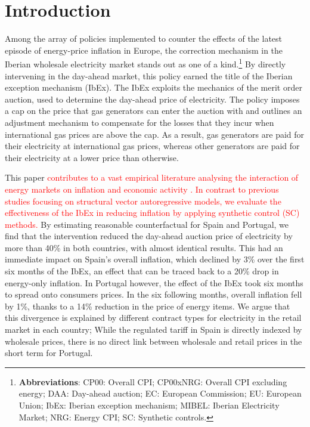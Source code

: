 \documentclass[12pt,a4paper]{article}
\begin{document}
\section{Introduction}\label{intro}
Among the array of policies implemented to counter the effects of the latest episode of energy-price inflation in Europe, the correction mechanism in the Iberian wholesale electricity market stands out as one of a kind.\footnote{\textbf{Abbreviations}: CP00: Overall CPI; CP00xNRG: Overall CPI excluding energy; DAA: Day-ahead auction; EC: European Commission; EU: European Union; IbEx: Iberian exception mechanism; MIBEL: Iberian Electricity Market; NRG: Energy CPI; SC: Synthetic controls.} By directly intervening in the day-ahead market, this policy earned the title of the Iberian exception mechanism (IbEx). The IbEx exploits the mechanics of the merit order auction, used to determine the day-ahead price of electricity. The policy imposes a cap on the price that gas generators can enter the auction with and outlines an adjustment mechanism to compensate for the losses that they incur when international gas prices are above the cap. As a result, gas generators are paid for their electricity at international gas prices, whereas other generators are paid for their electricity at a lower price than otherwise.\par 
This paper \textcolor{red}{contributes to a vast empirical literature analysing the interaction of energy markets on inflation and economic activity \parencite{clark2010time, baumeister2016forty, barsky2002oil, kilian2022impact}. In contrast to previous studies focusing on structural vector autoregressive models, we evaluate the effectiveness of the IbEx in reducing inflation by applying synthetic control (SC) methods.} By estimating reasonable counterfactual for Spain and Portugal, we find that the intervention reduced the day-ahead auction price of electricity by more than 40\% in both countries, with almost identical results. This had an immediate impact on Spain's overall inflation, which declined by 3\% over the first six months of the IbEx, an effect that can be traced back to a 20\% drop in energy-only inflation. In Portugal however, the effect of the IbEx took six months to spread onto consumers prices. In the six following months, overall inflation fell by 1\%, thanks to a 14\% reduction in the price of energy items. We argue that this divergence is explained by different contract types for electricity in the retail market in each country; While the regulated tariff in Spain is directly indexed by wholesale prices, there is no direct link between wholesale and retail prices in the short term for Portugal.\par 
\end{document}
